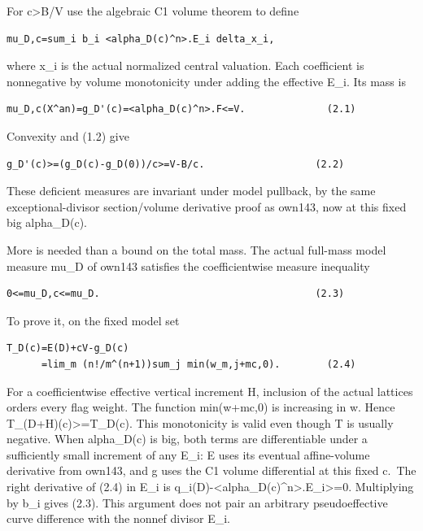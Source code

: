 \documentclass[
  10pt,
]{article}
\begin{document}
For c\textgreater B/V use the algebraic C1 volume theorem to define

\begin{verbatim}
mu_D,c=sum_i b_i <alpha_D(c)^n>.E_i delta_x_i,
\end{verbatim}

where x\_i is the actual normalized central valuation. Each coefficient
is nonnegative by volume monotonicity under adding the effective E\_i.
Its mass is

\begin{verbatim}
mu_D,c(X^an)=g_D'(c)=<alpha_D(c)^n>.F<=V.              (2.1)
\end{verbatim}

Convexity and (1.2) give

\begin{verbatim}
g_D'(c)>=(g_D(c)-g_D(0))/c>=V-B/c.                   (2.2)
\end{verbatim}

These deficient measures are invariant under model pullback, by the same
exceptional-divisor section/volume derivative proof as own143, now at
this fixed big alpha\_D(c).

More is needed than a bound on the total mass. The actual full-mass
model measure mu\_D of own143 satisfies the coefficientwise measure
inequality

\begin{verbatim}
0<=mu_D,c<=mu_D.                                     (2.3)
\end{verbatim}

To prove it, on the fixed model set

\begin{verbatim}
T_D(c)=E(D)+cV-g_D(c)
      =lim_m (n!/m^(n+1))sum_j min(w_m,j+mc,0).        (2.4)
\end{verbatim}

For a coefficientwise effective vertical increment H, inclusion of the
actual lattices orders every flag weight. The function min(w+mc,0) is
increasing in w. Hence T\_(D+H)(c)\textgreater=T\_D(c). This
monotonicity is valid even though T is usually negative. When
alpha\_D(c) is big, both terms are differentiable under a sufficiently
small increment of any E\_i: E uses its eventual affine-volume
derivative from own143, and g uses the C1 volume differential at this
fixed c.~The right derivative of (2.4) in E\_i is
q\_i(D)-\textless alpha\_D(c)\^{}n\textgreater.E\_i\textgreater=0.
Multiplying by b\_i gives (2.3). This argument does not pair an
arbitrary pseudoeffective curve difference with the nonnef divisor E\_i.
\end{document}
